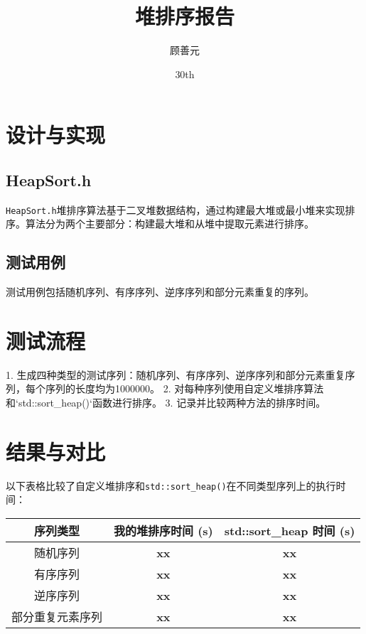 \documentclass{article}
\title{堆排序报告}
\author{顾善元}
\date{\Nov 30th}
\begin{document}
\maketitle

\section{设计与实现}
\subsection{HeapSort.h}
\texttt{HeapSort.h}堆排序算法基于二叉堆数据结构，通过构建最大堆或最小堆来实现排序。算法分为两个主要部分：构建最大堆和从堆中提取元素进行排序。

\subsection{测试用例}
测试用例包括随机序列、有序序列、逆序序列和部分元素重复的序列。

\section{测试流程}
1. 生成四种类型的测试序列：随机序列、有序序列、逆序序列和部分元素重复序列，每个序列的长度均为1000000。
2. 对每种序列使用自定义堆排序算法和`std::sort_heap()`函数进行排序。
3. 记录并比较两种方法的排序时间。

\section{结果与对比}
以下表格比较了自定义堆排序和\texttt{std::sort\_heap()}在不同类型序列上的执行时间：

\begin{center}
\begin{tabular}{|c|c|c|}
\hline
\textbf{序列类型} & \textbf{我的堆排序时间 (s)} & \textbf{std::sort\_heap 时间 (s)} \\
\hline
随机序列 & \textbf{xx} & \textbf{xx} \\
有序序列 & \textbf{xx} & \textbf{xx} \\
逆序序列 & \textbf{xx} & \textbf{xx} \\
部分重复元素序列 & \textbf{xx} & \textbf{xx} \\
\hline
\end{tabular}
\end{center}
\end{document}
